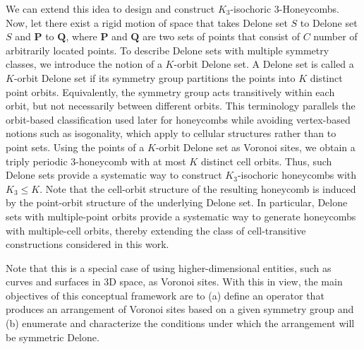 \documentclass[times,twocolumn,final]{elsarticle}
\newcommand{\ergun}[1]{{\color{red} #1}}
\begin{document}

We can extend this idea to design and construct $K_3$-isochoric 3-Honeycombs. Now, let there exist a rigid motion of space that takes  Delone set $S$ to  Delone set $S$ and $\mathbf{P}$ to $\mathbf{Q}$, where $\mathbf{P}$ and $\mathbf{Q}$ are two sets of points that consist of $C$ number of arbitrarily located points. {\color{red}To describe Delone sets with multiple symmetry classes, we introduce the notion of a $K$-orbit Delone set. A Delone set is called a $K$-orbit Delone set if its symmetry group partitions the points into $K$ distinct point orbits. Equivalently, the symmetry group acts transitively within each orbit, but not necessarily between different orbits. This terminology parallels the orbit-based classification used later for honeycombs while avoiding vertex-based notions such as isogonality, which apply to cellular structures rather than to point sets. Using the points of a $K$-orbit Delone set as Voronoi sites, we obtain a triply periodic 3-honeycomb with at most $K$ distinct cell orbits. Thus, such Delone sets provide a systematic way to construct $K_3$-isochoric honeycombs with $K_3 \leq K$. Note that the cell-orbit structure of the resulting honeycomb is induced by the point-orbit structure of the underlying Delone set. In particular, Delone sets with multiple-point orbits provide a systematic way to generate honeycombs with multiple-cell orbits, thereby extending the class of cell-transitive constructions considered in this work.} 

Note that this is a special case of using higher-dimensional entities, such as curves and surfaces in 3D space, as Voronoi sites. With this in view, the main objectives of this conceptual framework are to (a) define an operator that produces an arrangement of Voronoi sites based on a given symmetry group and (b) enumerate and characterize the conditions under which the arrangement will be symmetric Delone.
\end{document}
